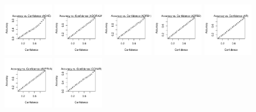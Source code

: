 \documentclass[utf8]{frontiersSCNS} %
\begin{document}
\begin{figure}[h!]
\includegraphics[width=0.19\textwidth]{figures/calibration_plots/ache_calib.pdf}
\includegraphics[width=0.19\textwidth]{figures/calibration_plots/adora2a_calib.pdf}
\includegraphics[width=0.19\textwidth]{figures/calibration_plots/adrb1_calib.pdf}
\includegraphics[width=0.19\textwidth]{figures/calibration_plots/adrb2_calib.pdf}
\includegraphics[width=0.19\textwidth]{figures/calibration_plots/ar_calib.pdf}
\includegraphics[width=0.19\textwidth]{figures/calibration_plots/avpr1a_calib.pdf}
\includegraphics[width=0.19\textwidth]{figures/calibration_plots/cckar_calib.pdf}

\end{figure}
\end{document}

